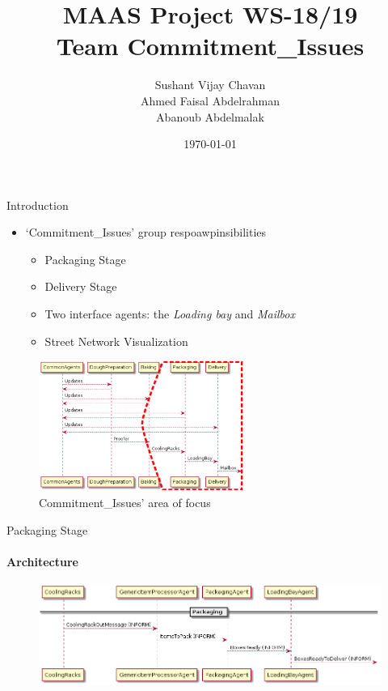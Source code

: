 \documentclass[9pt, aspectratio=169]{beamer}
\title{MAAS Project WS-18/19 \\ Team Commitment\_Issues}
\author{Sushant Vijay Chavan\\Ahmed Faisal Abdelrahman\\Abanoub Abdelmalak}
\date{\today}
\let\olditem=\item%
\renewcommand{\item}{\olditem \justifying}%
\begin{document}
\maketitle

\begin{frame}{Introduction}
	\begin{itemize}
		\item `Commitment\_Issues' group respoawpinsibilities
		\begin{itemize}
			\item Packaging Stage
			\item Delivery Stage
			\item Two interface agents: the \textit{Loading bay} and \textit{Mailbox}
			\item Street Network Visualization
		\end{itemize}
	\end{itemize}
	
	\begin{figure}[h!]
	\centering
	\includegraphics[width=0.6\textwidth]{Architecture_Stages.png}
	\caption{Commitment\_Issues' area of focus}
\end{figure}
\end{frame}

\begin{frame}{Packaging Stage}
\framesubtitle{Architecture}
\begin{figure}[h!]
	\centering
	\includegraphics[width=\textwidth]{../Architecture/Architecture_Packaging.png}
\end{figure}
\end{frame}
\end{document}
